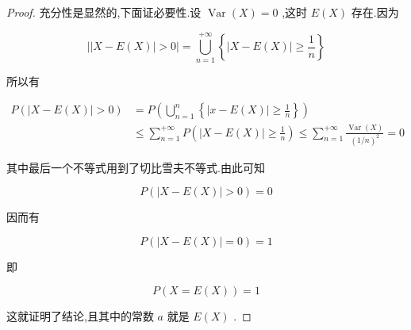 \begin{proof}
	充分性是显然的,下面证必要性.设 $ \operatorname{Var}(X)=0 $ ,这时 $ E(X) $ 存在.因为
	
	\[
	| | X-E(X)|>0|=\bigcup_{n=1}^{+\infty}\left\{|X-E(X)| \geqslant \frac{1}{n}\right\}
	\]
	
	所以有
	
	\[
	\begin{aligned} P(|X-E(X)|>0) &=P\left(\bigcup_{n=1}^{n}\left\{|x-E(X)| \geqslant \frac{1}{n}\right\}\right) \\ & \leqslant \sum_{n=1}^{+\infty} P\left(|X-E(X)| \geqslant \frac{1}{n}\right) \leqslant \sum_{n=1}^{+\infty} \frac{\operatorname{Var}(X)}{(1 / n)^{2}}=0 \end{aligned}
	\]
	
	其中最后一个不等式用到了切比雪夫不等式.由此可知
	
	\[
	P(|X-E(X)|>0)=0
	\]
	
	因而有
	
	\[
	P(|X-E(X)|=0)=1
	\]
	
	即
	
	\[
	P(X=E(X))=1
	\]
	
	这就证明了结论,且其中的常数 $ a $ 就是 $ E(X) $ .
\end{proof}

